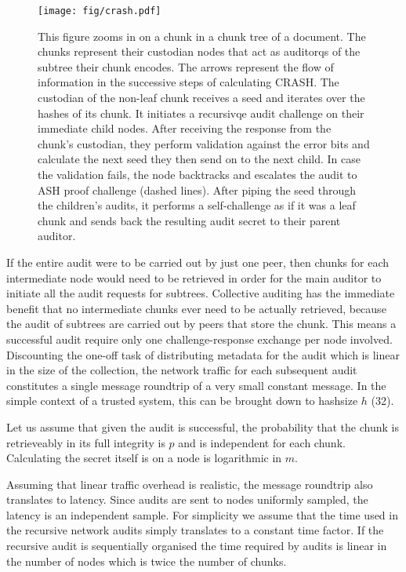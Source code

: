 \documentclass[12pt]{article}
\begin{document}
\begin{figure}[htbp]
   \centering
   \texttt{[image: fig/crash.pdf]} %
   \caption{This figure zooms in on a chunk in a chunk tree of a document. The chunks represent their custodian nodes that act as auditorqs of the subtree their chunk encodes. The arrows represent the flow of information in the successive steps of calculating CRASH. The custodian of the non-leaf chunk receives a seed and iterates over the hashes of its chunk. It initiates a recursivqe audit challenge on their immediate child nodes. After receiving the response from the chunk's custodian, they perform validation against the error bits and calculate the next seed they then send on to the next child. In case the validation fails, the node backtracks and escalates the audit  to ASH proof challenge    (dashed lines). After piping the seed through the children's audits, it performs a self-challenge as if it was a leaf chunk and sends back the resulting audit secret to their parent auditor.
   }
   \label{fig:crash}
\end{figure}

If the entire audit were to be carried out by just one peer, then chunks for each intermediate node would need to be retrieved in order for the main auditor to initiate all the audit requests for subtrees. Collective auditing has the immediate benefit that no intermediate chunks ever need to be actually retrieved, because the audit of subtrees are carried out by peers that store the chunk. This means a successful audit require only one challenge-response exchange per node involved.
Discounting the one-off task of distributing metadata for the audit which is linear in the size of the collection, the network traffic for each subsequent audit
constitutes a single message roundtrip of a very small constant message.
In the simple context of a trusted system, this can be brought down to hashsize $h$ (32).

Let us assume that given the audit is successful, the probability that the chunk is retrieveably in its full integrity is $p$ and is independent for each chunk.
Calculating the secret itself is on a node is logarithmic in $m$.


Assuming that linear traffic overhead is realistic, the message roundtrip also translates to latency. Since audits are sent to nodes uniformly sampled, the latency is an independent sample. For simplicity we assume that the time used in the recursive network audits simply translates to a constant time factor. If the recursive audit is sequentially organised the time required by audits is linear in the number of nodes which is twice the number of chunks.
\end{document}
